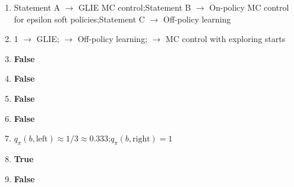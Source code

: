 \documentclass[11pt,oneside]{article}
\begin{document}
\begin{enumerate}[label=\textbf{Q\arabic*.}, leftmargin=3em, itemsep=4pt]
  \item Statement A $\rightarrow$ GLIE MC control;\quad Statement B $\rightarrow$ On-policy MC control for epsilon soft policies;\quad Statement C $\rightarrow$ Off-policy learning
  \item 1 $\rightarrow$ GLIE; $\rightarrow$ Off-policy learning; $\rightarrow$ MC control with exploring starts
  \item \textbf{False}
  \item \textbf{False}
  \item \textbf{False}
  \item \textbf{False}
  \item $q_\pi(b, \text{left}) \approx 1/3 \approx 0.333$;\quad $q_\pi(b, \text{right}) = 1$
  \item \textbf{True}
  \item \textbf{False}


\end{enumerate}
\end{document}
